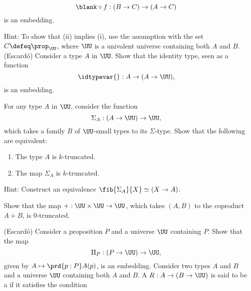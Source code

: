 \begin{exercises}
\begin{enumerate}
\begin{equation*}
      \blank\circ f:(B\to C)\to (A\to C)
    \end{equation*}
    is an embedding.
  \end{enumerate}
  Hint: To show that (ii) implies (i), use the assumption with the set $C\defeq\prop_\UU$, where $\UU$ is a univalent universe containing both $A$ and $B$.
  \exitem (Escard\'o)\label{ex:idtype-is-emb} Consider a type $A$ in $\UU$. Show that the identity type, seen as a function
  \begin{equation*}
    \idtypevar{} : A \to (A\to\UU),
  \end{equation*}
  is an embedding.
  \exitem
  \begin{subexenum}
  \item For any type $A$ in $\UU$, consider the function
    \begin{equation*}
      \Sigma_A : (A \to \UU) \to \UU,
    \end{equation*}
    which takes a family $B$ of $\UU$-small types to its $\Sigma$-type. Show that the following are equivalent:
    \begin{enumerate}
    \item The type $A$ is $k$-truncated.
    \item The map $\Sigma_A$ is $k$-truncated.
    \end{enumerate}
    Hint: Construct an equivalence $\fib{\Sigma_A}{X}\simeq (X\to A)$.
  \item Show that the map ${+}:\UU\times\UU\to\UU$, which takes $(A,B)$ to the coproduct $A+B$, is $0$-truncated.
  \end{subexenum}
  \exitem (Escard\'o) Consider a proposition $P$ and a universe $\UU$ containing $P$. Show that the map
  \begin{equation*}
    \Pi_P : (P\to \UU)\to\UU,
  \end{equation*}
  given by $A\mapsto\prd{p:P}A(p)$, is an embedding.
  \exitem Consider two types $A$ and $B$ and a universe $\UU$ containing both $A$ and $B$. A  $R:A\to(B\to\UU)$ is said to be a  if it satisfies the condition

\end{exercises}
